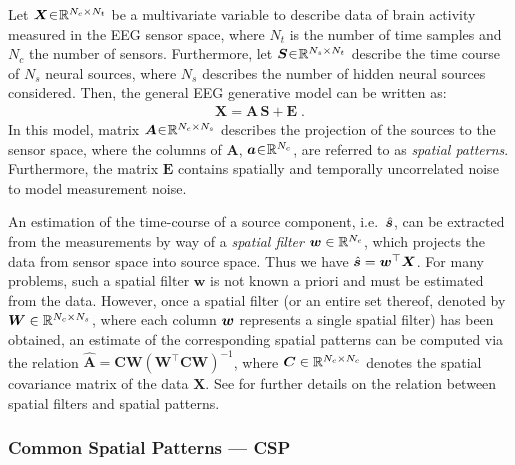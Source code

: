 \documentclass[10pt,a4paper]{article}
\providecommand{\mat}[1]{{\bm {#1}}}
\begin{document}
Let $\mat{X}\negmedspace\in\negmedspace \Real^{N_c \times N_t}$ be a multivariate variable to describe data of brain activity measured in the EEG sensor space, where $N_t$ is the number of time samples and $N_c$ the number of sensors. Furthermore, let $\mat{S} \negmedspace\in\negmedspace \Real^{N_s \times N_t}$ describe the time course of $N_s$ neural sources, where $N_s$ describes the number of hidden neural sources considered. Then, the general EEG generative model can be written as: 
\begin{align}\label{eq:genModel}
\mat{X}=\mat{A}\,\mat{S} + \mat{E} \;.
\end{align} 
In this model, matrix $\mat{A}\negmedspace\in\negmedspace \Real^{N_c \times N_s}$ describes the projection of the sources to the sensor space, where the columns of $\mat{A}$, ${\bm {a}} \negmedspace\in\negmedspace \mathbb{R}^{N_c}$, are referred to as \emph{spatial patterns}. Furthermore, the matrix $\mat{E}$ contains spatially and temporally uncorrelated noise to model measurement noise. 

An estimation of the time-course of a source component, i.e.\ $\hat{{\bm {s}}}$, can be extracted from the measurements by way of a \emph{spatial filter} ${\bm {w}} \in \mathbb{R}^{N_c}$, which projects the data from sensor space into source space. Thus we have $\hat{\ve{s}} = \ve{w}^\top\mat{X}$.
For many problems, such a spatial filter $\mat{w}$ is not known a priori and must be estimated from the data. However, once a spatial filter (or an entire set thereof, denoted by $\mat{W} \in \Real^{N_c \times N_s}$, where each column ${\bm {w}}$ represents a single spatial filter) has been obtained, an estimate of the corresponding spatial patterns can be computed via the relation $ \hat{\mat{A}} = \mat{C} \mat{W} \left( \mat{W}^\top \mat{C} \mat{W} \right)^{-1} $, where $\mat{C} \in  \Real^{N_c \times N_c} $ denotes the spatial covariance matrix of the data $\mat{X}$. See \cite{haufe2014interpretation} for further details on the relation between spatial filters and spatial patterns.  

\subsubsection{Common Spatial Patterns --- CSP}
\end{document}

